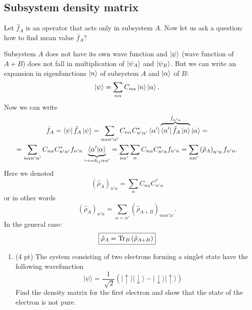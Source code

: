 \subsection{Subsystem density matrix}

Let $\hat{f}_A$ is an operator that acts only in subsystem $A$. Now let us ask a question: how to find mean value $\bar{f}_A$?

Subsystem $A$ does not have its own wave function and $\left\lvert {\psi} \right\rangle$ (wave function of $A + B$) does not fall in multiplication of $\left\lvert {\psi_A} \right\rangle$ and $\left\lvert {\psi_B} \right\rangle$. But we can write an expansion in eigenfunctions $\left\lvert {n} \right\rangle$ of subsystem $A$ and $\left\lvert {\alpha} \right\rangle$ of $B$:
\begin{equation}
	\left\lvert {\psi} \right\rangle = \sum_{n \alpha} C_{n \alpha} \left\lvert {n} \right\rangle \left\lvert {\alpha} \right\rangle.
\end{equation}
Now we can write
\begin{multline}
	\bar{f}_A = \left\langle {\psi} \right\rvert \hat{f}_A \left\lvert {\psi} \right\rangle = \sum_{n \alpha n' \alpha'} C_{n \alpha} C^*_{n' \alpha'} \left\langle {\alpha'} \right\rvert \overbrace{\left\langle {n'} \right\rvert \hat{f}_A \left\lvert {n} \right\rangle}^{f_{n' n}} \left\lvert {\alpha} \right\rangle = \\ =
	\sum_{n \alpha n' \alpha'} C_{n \alpha} C^*_{n' \alpha'} f_{n' n} \underbrace{\langle {\alpha'} \lvert {\alpha} \rangle}_{\hookrightarrow = \delta_{ij}\alpha \alpha'} = \sum_{n n'} \sum_{\alpha}  C_{n \alpha} C^*_{n' \alpha} f_{n' n} = \sum_{n n'} \left( \hat{\rho}_A \right)_{n' n} f_{n' n}.
\end{multline}
Here we denoted
\begin{equation}
	\left( \hat{\rho}_A \right)_{n' n} = \sum_{\alpha}  C_{n \alpha} C^*_{n' \alpha}
\end{equation}
or in other words
\begin{equation}
	\left( \hat{\rho}_A \right)_{n' n} = \sum_{\alpha = \alpha'} \left( \hat{\rho}_{A+B} \right)_{n \alpha n' \alpha'}.
\end{equation}
In the general case:
\begin{equation}
	\boxed{\hat{\rho}_A = \operatorname{Tr}_B \left( \hat{\rho}_{A+B} \right)}
\end{equation}



\begin{hw}

\begin{enumerate}
	\item (4 pt) The system consisting of two electrons forming a singlet state have the following wavefunction
	$$
	|\psi \rangle = \frac{1}{\sqrt[]{2}}\left( |\uparrow \rangle|\downarrow \rangle - |\downarrow \rangle |\uparrow\rangle \right)
	$$
	Find the density matrix for the first electron and show that the state of the electron is not pure.
\end{enumerate}	
\end{hw}	


